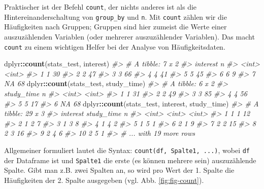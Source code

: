 \documentclass[12pt,ngerman,]{book}
\makeatletter
\newenvironment{Shaded}{\begin{snugshade}}{\end{snugshade}}
\newcommand{\KeywordTok}[1]{\textcolor[rgb]{0.13,0.29,0.53}{\textbf{#1}}}
\newcommand{\CommentTok}[1]{\textcolor[rgb]{0.56,0.35,0.01}{\textit{#1}}}
\newcommand{\OperatorTok}[1]{\textcolor[rgb]{0.81,0.36,0.00}{\textbf{#1}}}
\newcommand{\NormalTok}[1]{#1}
\newenvironment{kframe}{%
\medskip{}
\setlength{\fboxsep}{.8em}
 \def\at@end@of@kframe{}%
 \ifinner\ifhmode%
  \def\at@end@of@kframe{\end{minipage}}%
  \begin{minipage}{\columnwidth}%
 \fi\fi%
 \def\FrameCommand##1{\hskip\@totalleftmargin \hskip-\fboxsep
 \colorbox{shadecolor}{##1}\hskip-\fboxsep
     \hskip-\linewidth \hskip-\@totalleftmargin \hskip\columnwidth}%
 \MakeFramed {\advance\hsize-\width
   \@totalleftmargin\z@ \linewidth\hsize
   \@setminipage}}%
 {\par\unskip\endMakeFramed%
 \at@end@of@kframe}
\renewenvironment{Shaded}{\begin{kframe}}{\end{kframe}}
\theoremstyle{definition}
\theoremstyle{definition}
\theoremstyle{remark}
\makeatother
\begin{document}
Praktischer ist der Befehl \texttt{count}, der
nichts anderes ist als die Hintereinanderschaltung von
\texttt{group\_by} und \texttt{n}. Mit \texttt{count} zählen wir die
Häufigkeiten nach Gruppen; Gruppen sind hier zumeist die Werte einer
auszuzählenden Variablen (oder mehrerer auszuzählender Variablen). Das
macht \texttt{count} zu einem wichtigen Helfer bei der Analyse von
Häufigkeitsdaten.

\begin{Shaded}
\begin{Highlighting}[]
\NormalTok{dplyr}\OperatorTok{::}\KeywordTok{count}\NormalTok{(stats_test, interest)}
\CommentTok{#> # A tibble: 7 x 2}
\CommentTok{#>   interest     n}
\CommentTok{#>      <int> <int>}
\CommentTok{#> 1        1    30}
\CommentTok{#> 2        2    47}
\CommentTok{#> 3        3    66}
\CommentTok{#> 4        4    41}
\CommentTok{#> 5        5    45}
\CommentTok{#> 6        6     9}
\CommentTok{#> 7       NA    68}
\NormalTok{dplyr}\OperatorTok{::}\KeywordTok{count}\NormalTok{(stats_test, study_time)}
\CommentTok{#> # A tibble: 6 x 2}
\CommentTok{#>   study_time     n}
\CommentTok{#>        <int> <int>}
\CommentTok{#> 1          1    31}
\CommentTok{#> 2          2    49}
\CommentTok{#> 3          3    85}
\CommentTok{#> 4          4    56}
\CommentTok{#> 5          5    17}
\CommentTok{#> 6         NA    68}
\NormalTok{dplyr}\OperatorTok{::}\KeywordTok{count}\NormalTok{(stats_test, interest, study_time)}
\CommentTok{#> # A tibble: 29 x 3}
\CommentTok{#>    interest study_time     n}
\CommentTok{#>       <int>      <int> <int>}
\CommentTok{#>  1        1          1    12}
\CommentTok{#>  2        1          2     7}
\CommentTok{#>  3        1          3     8}
\CommentTok{#>  4        1          4     2}
\CommentTok{#>  5        1          5     1}
\CommentTok{#>  6        2          1     9}
\CommentTok{#>  7        2          2    15}
\CommentTok{#>  8        2          3    16}
\CommentTok{#>  9        2          4     6}
\CommentTok{#> 10        2          5     1}
\CommentTok{#> # ... with 19 more rows}
\end{Highlighting}
\end{Shaded}

Allgemeiner formuliert lautet die Syntax:
\texttt{count(df,\ Spalte1,\ ...)}, wobei \texttt{df} der Dataframe ist
und \texttt{Spalte1} die erste (es können mehrere sein) auszuzählende
Spalte. Gibt man z.B. zwei Spalten an, so wird pro Wert der 1. Spalte
die Häufigkeiten der 2. Spalte ausgegeben (vgl. Abb.
\ref{fig:fig-count}).
\end{document}
